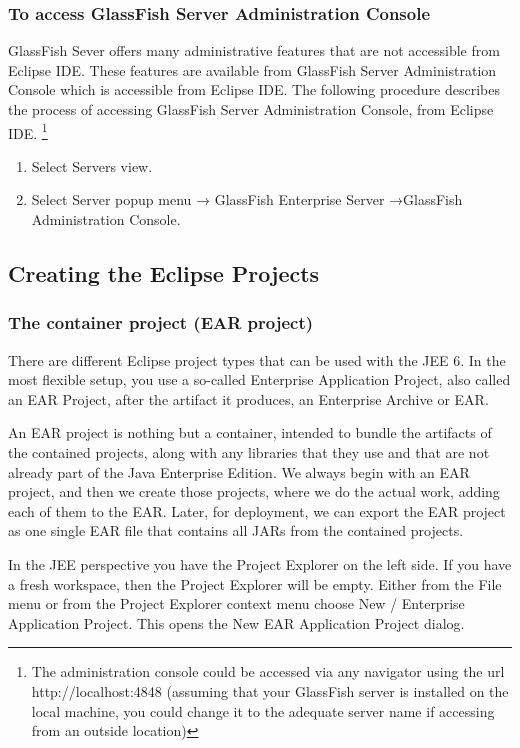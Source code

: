 \subsubsection{To access GlassFish Server Administration Console}
GlassFish Sever offers many administrative features that are not accessible from Eclipse IDE.
These features are available from GlassFish Server Administration Console which is accessible
from Eclipse IDE. The following procedure describes the process of accessing GlassFish Server
Administration Console, from Eclipse IDE.
\footnote{The administration console could be accessed via any navigator using the url http://localhost:4848 (assuming that your GlassFish server is installed on the local machine, you could change it to the adequate server name if accessing from an outside location)}
\begin{enumerate}
\item Select Servers view.
\item Select Server popup menu → GlassFish Enterprise Server →GlassFish Administration Console.
\end{enumerate}

\subsection{Creating the Eclipse Projects}
\subsubsection{The container project (EAR project)}
There are different Eclipse project types that can be used with the JEE 6. In the most flexible setup, you use a so-called Enterprise Application Project, also called an EAR Project, after the artifact it produces, an Enterprise Archive or EAR.

An EAR project is nothing but a container, intended to bundle the artifacts of the contained projects, along with any libraries that they use and that are not already part of the Java Enterprise Edition. We always begin with an EAR project, and then we create those projects, where we do the actual work, adding each of them to the EAR. Later, for deployment, we can export the EAR project as one single EAR file that contains all JARs from the contained projects.

In the JEE perspective you have the Project Explorer on the left side. If you have a fresh workspace, then the Project Explorer will be empty. Either from the File menu or from the Project Explorer context menu choose New / Enterprise Application Project. This opens the New EAR Application Project dialog.

